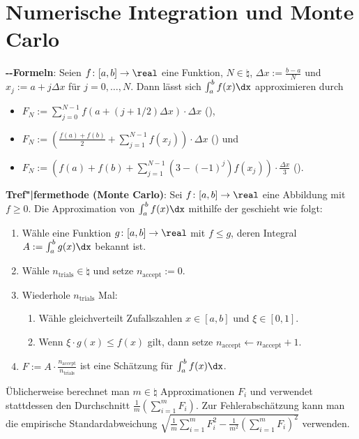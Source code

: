 \pagebreak

\section{%
    Numerische Integration und Monte Carlo%
}

\textbf{--Formeln}:
Seien $f\colon [a, b] \to \real$ eine Funktion, $N \in \natural$,
$\Delta x := \frac{b - a}{N}$ und $x_j := a + j \Delta x$ für $j = 0, \dotsc, N$.
Dann lässt sich $\int_a^b f(x) \dx$ approximieren durch
\begin{itemize}
    \item
    $F_N := \sum_{j=0}^{N-1} f(a + (j+1/2) \Delta x) \cdot \Delta x$
    (),

    \item
    $F_N := \left(\frac{f(a) + f(b)}{2} + \sum_{j=1}^{N-1} f(x_j)\right) \cdot \Delta x$
    () und

    \item
    $F_N := \left(f(a) + f(b) + \sum_{j=1}^{N-1} (3 - (-1)^j) f(x_j)\right)
    \cdot \frac{\Delta x}{3}$
    ().
\end{itemize}

\linie

\textbf{Tref"|fermethode (Monte Carlo)}:
Sei $f\colon [a, b] \to \real$ eine Abbildung mit $f \ge 0$.
Die Approximation von $\int_a^b f(x) \dx$ mithilfe der 
geschieht wie folgt:
\begin{enumerate}
    \item
    Wähle eine Funktion $g\colon [a, b] \to \real$ mit $f \le g$, deren Integral
    $A := \int_a^b g(x) \dx$ bekannt ist.

    \item
    Wähle $n_{\text{trials}} \in \natural$ und setze $n_{\text{accept}} := 0$.

    \item
    Wiederhole $n_{\text{trials}}$ Mal:
    \begin{enumerate}
        \item
        Wähle gleichverteilt Zufallszahlen $x \in [a, b]$ und $\xi \in [0, 1]$.

        \item
        Wenn $\xi \cdot g(x) \le f(x)$ gilt,
        dann setze $n_{\text{accept}} \leftarrow n_{\text{accept}} + 1$.
    \end{enumerate}

    \item
    $F := A \cdot \frac{n_{\text{accept}}}{n_{\text{trials}}}$ ist eine Schätzung für
    $\int_a^b f(x) \dx$.
\end{enumerate}
Üblicherweise berechnet man $m \in \natural$ Approximationen $F_i$ und
verwendet stattdessen den Durchschnitt $\frac{1}{m} (\sum_{i=1}^m F_i)$.
Zur Fehlerabschätzung kann man die empirische Standardabweichung
$\sqrt{\frac{1}{m} \sum_{i=1}^m F_i^2 - \frac{1}{m^2} (\sum_{i=1}^m F_i)^2}$ verwenden.

